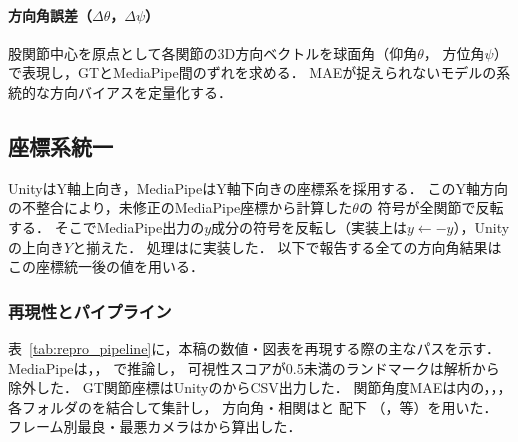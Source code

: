 \documentclass[fleqn]{ieej}
\begin{document}
\paragraph{方向角誤差（$\Delta\theta$，$\Delta\psi$）}
股関節中心を原点として各関節の3D方向ベクトルを球面角（仰角$\theta$，
方位角$\psi$）で表現し，GTとMediaPipe間のずれを求める．
MAEが捉えられないモデルの系統的な方向バイアスを定量化する．

\subsection{座標系統一}

UnityはY軸上向き，MediaPipeはY軸下向きの座標系を採用する．
このY軸方向の不整合により，未修正のMediaPipe座標から計算した$\theta$の
符号が全関節で反転する．
そこでMediaPipe出力の$y$成分の符号を反転し（実装上は$y\leftarrow -y$），Unityの上向き$Y$と揃えた．
処理はに実装した．
以下で報告する全ての方向角結果はこの座標統一後の値を用いる．

\subsubsection{再現性とパイプライン}

表~\ref{tab:repro_pipeline}に，本稿の数値・図表を再現する際の主なパスを示す．
MediaPipeは，，
で推論し，
可視性スコアが0.5未満のランドマークは解析から除外した．
GT関節座標はUnityのからCSV出力した．
関節角度MAEは内の，，，各フォルダのを結合して集計し，
方向角・相関はと
配下
（，等）を用いた．
フレーム別最良・最悪カメラはから算出した．
\end{document}
